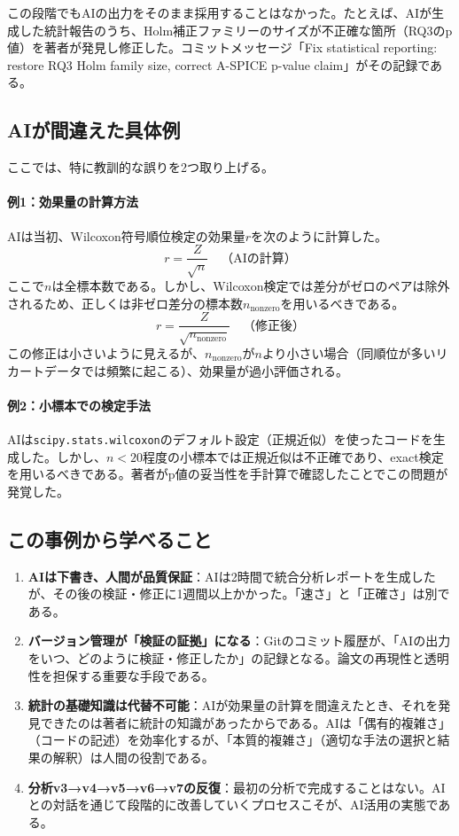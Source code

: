 この段階でもAIの出力をそのまま採用することはなかった。たとえば、AIが生成した統計報告のうち、Holm補正ファミリーのサイズが不正確な箇所（RQ3のp値）を著者が発見し修正した。コミットメッセージ「Fix statistical reporting: restore RQ3 Holm family size, correct A-SPICE p-value claim」がその記録である。

\subsection{AIが間違えた具体例}

ここでは、特に教訓的な誤りを2つ取り上げる。

\paragraph{例1：効果量の計算方法}

AIは当初、Wilcoxon符号順位検定の効果量$r$を次のように計算した。
\[
r = \frac{Z}{\sqrt{n}} \quad \text{（AIの計算）}
\]
ここで$n$は全標本数である。しかし、Wilcoxon検定では差分がゼロのペアは除外されるため、正しくは非ゼロ差分の標本数$n_{\text{nonzero}}$を用いるべきである。
\[
r = \frac{Z}{\sqrt{n_{\text{nonzero}}}} \quad \text{（修正後）}
\]
この修正は小さいように見えるが、$n_{\text{nonzero}}$が$n$より小さい場合（同順位が多いリカートデータでは頻繁に起こる）、効果量が過小評価される。

\paragraph{例2：小標本での検定手法}

AIは\texttt{scipy.stats.wilcoxon}のデフォルト設定（正規近似）を使ったコードを生成した。しかし、$n<20$程度の小標本では正規近似は不正確であり、exact検定を用いるべきである。著者がp値の妥当性を手計算で確認したことでこの問題が発覚した。

\subsection{この事例から学べること}

\begin{enumerate}
\item \textbf{AIは下書き、人間が品質保証}：AIは2時間で統合分析レポートを生成したが、その後の検証・修正に1週間以上かかった。「速さ」と「正確さ」は別である。
\item \textbf{バージョン管理が「検証の証拠」になる}：Gitのコミット履歴が、「AIの出力をいつ、どのように検証・修正したか」の記録となる。論文の再現性と透明性を担保する重要な手段である。
\item \textbf{統計の基礎知識は代替不可能}：AIが効果量の計算を間違えたとき、それを発見できたのは著者に統計の知識があったからである。AIは「偶有的複雑さ」（コードの記述）を効率化するが、「本質的複雑さ」（適切な手法の選択と結果の解釈）は人間の役割である。
\item \textbf{分析v3→v4→v5→v6→v7の反復}：最初の分析で完成することはない。AIとの対話を通じて段階的に改善していくプロセスこそが、AI活用の実態である。
\end{enumerate}

